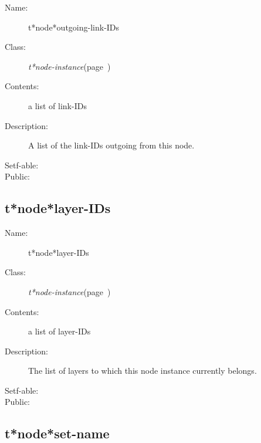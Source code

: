 \begin{description}
\item [Name:]  t*node*outgoing-link-IDs

\item [Class:] {\sl t*node-instance}\hfill(page~\pageref{t*node-instance})

\item [Contents:] a list of link-IDs

\item [Description:]

A list of the link-IDs outgoing from this node.

\item [Setf-able:]


\item [Public:]



\end{description}
\horizontalline

\subsection{t*node*layer-IDs}
\label{t*node*layer-IDs}

\begin{description}
\item [Name:]  t*node*layer-IDs

\item [Class:] {\sl t*node-instance}\hfill(page~\pageref{t*node-instance})

\item [Contents:] a list of layer-IDs

\item [Description:]

The list of layers to which this node instance 
currently belongs. 

\item [Setf-able:]


\item [Public:]



\end{description}
\horizontalline

\subsection{t*node*set-name}
\label{t*node*set-name}

